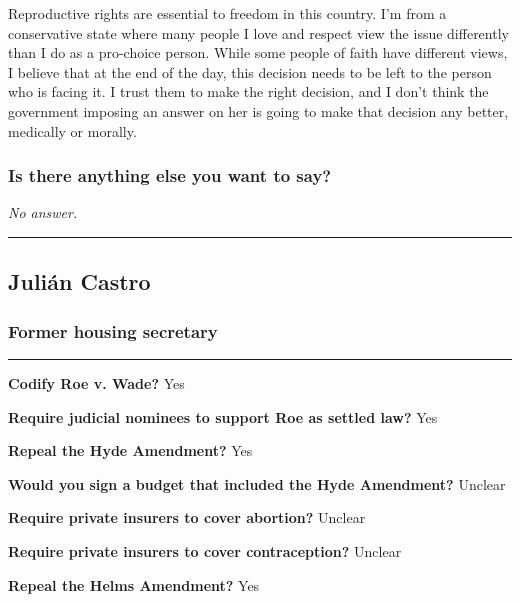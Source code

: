 Reproductive rights are essential to freedom in this country. I'm from a
conservative state where many people I love and respect view the issue
differently than I do as a pro-choice person. While some people of faith
have different views, I believe that at the end of the day, this
decision needs to be left to the person who is facing it. I trust them
to make the right decision, and I don't think the government imposing an
answer on her is going to make that decision any better, medically or
morally.

\hypertarget{is-there-anything-else-you-want-to-say-2}{%
\subsubsection{Is there anything else you want to
say?}\label{is-there-anything-else-you-want-to-say-2}}

\emph{No answer.}

\begin{center}\rule{0.5\linewidth}{\linethickness}\end{center}

\hypertarget{juliuxe1n-castro}{%
\subsection{Julián Castro}\label{juliuxe1n-castro}}

\hypertarget{former-housing-secretary}{%
\subsubsection{Former housing
secretary}\label{former-housing-secretary}}

\begin{center}\rule{0.5\linewidth}{\linethickness}\end{center}

\textbf{Codify Roe v. Wade?} Yes

\textbf{Require judicial nominees to support Roe as settled law?} Yes

\textbf{Repeal the Hyde Amendment?} Yes

\textbf{Would you sign a budget that included the Hyde Amendment?}
Unclear

\textbf{Require private insurers to cover abortion?} Unclear

\textbf{Require private insurers to cover contraception?} Unclear

\textbf{Repeal the Helms Amendment?} Yes

